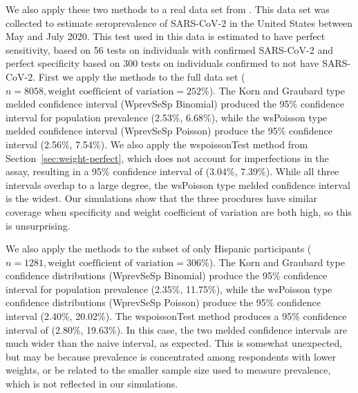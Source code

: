 \documentclass[AMA,STIX1COL]{WileyNJD-v2}
\begin{document}
We also apply these two methods to a real data set from \cite{Kali:2021}.
This data set was collected to estimate seroprevalence of SARS-CoV-2 in the United States between May and July 2020.
This test used in this data is estimated to have perfect sensitivity, based on 56 tests on individuals with confirmed SARS-CoV-2 and perfect specificity based on 300 tests on individuals confirmed to not have SARS-CoV-2.
First we apply the methods to the full data set (\( n =  8058, \text{weight coefficient of variation} = 252\%\)).
The Korn and Graubard type melded confidence interval (WprevSeSp Binomial) produced the 95\% confidence interval for population prevalence (2.53\%, 6.68\%), while the wsPoisson type melded confidence interval (WprevSeSp Poisson) produce the 95\% confidence interval (2.56\%, 7.54\%).
We also apply the wspoissonTest method from Section~\ref{sec:weight-perfect}, which does not account for imperfections in the assay, resulting in a 95\% confidence interval of (3.04\%, 7.39\%).
While all three intervals overlap to a large degree, the wsPoisson type melded confidence interval is the widest.
Our simulations show that the three procdures have similar coverage when specificity and weight coefficient of variation are both high, so this is unsurprising.


We also apply the methods to the subset of only Hispanic participants (\( n = 1281, \text{weight coefficient of variation} = 306\% \)).
The Korn and Graubard type confidence distributions (WprevSeSp Binomial) produce the 95\% confidence interval for population prevalence (2.35\%, 11.75\%), while the wsPoisson type confidence distributions (WprevSeSp Poisson) produce the 95\% confidence interval (2.40\%, 20.02\%).
The wspoissonTest method produces a 95\% confidence interval of (2.80\%, 19.63\%).
In this case, the two melded confidence intervals are much wider than the naive interval, as expected.
This is somewhat unexpected, but may be because prevalence is concentrated among respondents with lower weights, or be related to the smaller sample size used to measure prevalence, which is not reflected in our simulations.

\pagebreak


\end{document}
